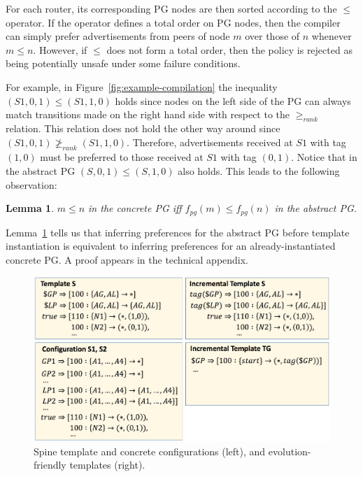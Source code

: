 \documentclass[numbers, 10pt]{sigplanconf}
\newtheorem{lem}[thm]{Lemma}
\newcommand{\Appendix}{technical appendix\xspace}
\begin{document}
For each router, its corresponding PG nodes are then sorted according to the $\leq$ operator. If the operator defines a total order on PG nodes, then the compiler can simply prefer advertisements from peers of node $m$ over those of $n$ whenever $m \leq n$. However, if $\leq$ does not form a total order, then the policy is rejected as being potentially unsafe under some failure conditions.


%
For example, in Figure~\ref{fig:example-compilation} the inequality $(S1,0,1) \leq (S1,1,0)$ holds since nodes on the left side of the PG can always match transitions made on the right hand side with respect to the $\geq_{rank}$ relation. This relation does not hold the other way around since $(S1,0,1) \ngeq_{rank} (S1,1,0)$. Therefore, advertisements received at $S1$ with tag $(1,0)$ must be preferred to those received at $S1$ with tag $(0,1)$.
%
Notice that in the abstract PG $(S,0,1) \leq (S,1,0)$ also holds. This leads to the following observation:

\begin{lem}
\label{lem:preference}
$m \leq n$ in the concrete PG iff $f_{pg}(m) \leq f_{pg}(n)$ in the abstract PG.
\end{lem}

Lemma~\ref{lem:preference} tells us that inferring preferences for the abstract PG before template instantiation is equivalent to inferring preferences for an already-instantiated concrete PG.  A proof appears in the \Appendix.


\begin{figure}[t!]
  \begin{center}
    \includegraphics[width=\columnwidth]{figures/configs}
  \end{center}
  \vspace{-1em}
  \caption{Spine template and concrete configurations (left), and evolution-friendly templates (right).}
  \label{fig:bgp-configs}
  \vspace{-.6em}
\end{figure}
\end{document}
